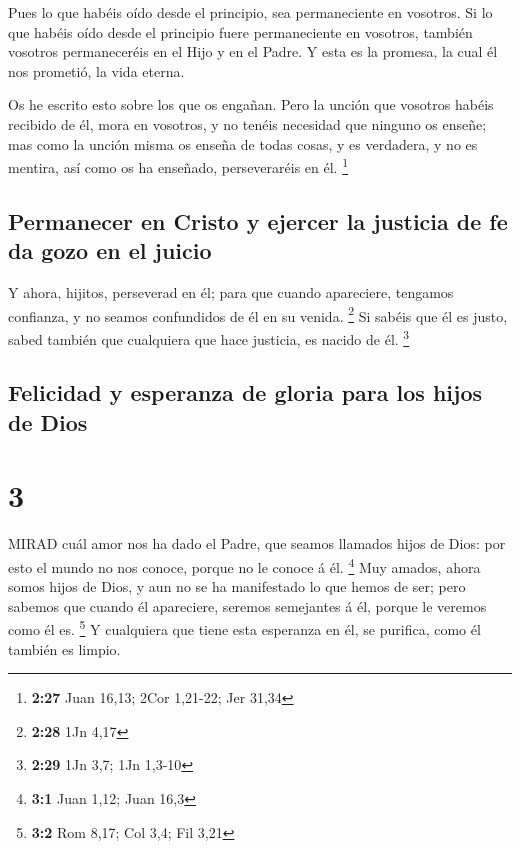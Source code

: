  Pues lo que habéis oído desde el principio, sea
permaneciente en vosotros. Si lo que habéis oído desde el principio
fuere permaneciente en vosotros, también vosotros permaneceréis en el
Hijo y en el Padre.  Y esta es la promesa, la cual él nos
prometió, la vida eterna.

 Os he escrito esto sobre los que os engañan. 
Pero la unción que vosotros habéis recibido de él, mora en vosotros, y
no tenéis necesidad que ninguno os enseñe; mas como la unción misma os
enseña de todas cosas, y es verdadera, y no es mentira, así como os ha
enseñado, perseveraréis en él. \footnote{\textbf{2:27} Juan 16,13; 2Cor
  1,21-22; Jer 31,34}

\hypertarget{permanecer-en-cristo-y-ejercer-la-justicia-de-fe-da-gozo-en-el-juicio}{%
\subsection{Permanecer en Cristo y ejercer la justicia de fe da gozo en
el
juicio}\label{permanecer-en-cristo-y-ejercer-la-justicia-de-fe-da-gozo-en-el-juicio}}

 Y ahora, hijitos, perseverad en él; para que cuando
apareciere, tengamos confianza, y no seamos confundidos de él en su
venida. \footnote{\textbf{2:28} 1Jn 4,17}  Si sabéis que él
es justo, sabed también que cualquiera que hace justicia, es nacido de
él. \footnote{\textbf{2:29} 1Jn 3,7; 1Jn 1,3-10}

\hypertarget{felicidad-y-esperanza-de-gloria-para-los-hijos-de-dios}{%
\subsection{Felicidad y esperanza de gloria para los hijos de
Dios}\label{felicidad-y-esperanza-de-gloria-para-los-hijos-de-dios}}

\hypertarget{section-2}{%
\section{3}\label{section-2}}

 MIRAD cuál amor nos ha dado el Padre, que seamos llamados
hijos de Dios: por esto el mundo no nos conoce, porque no le conoce á
él. \footnote{\textbf{3:1} Juan 1,12; Juan 16,3}  Muy
amados, ahora somos hijos de Dios, y aun no se ha manifestado lo que
hemos de ser; pero sabemos que cuando él apareciere, seremos semejantes
á él, porque le veremos como él es. \footnote{\textbf{3:2} Rom 8,17; Col
  3,4; Fil 3,21}  Y cualquiera que tiene esta esperanza en
él, se purifica, como él también es limpio.


